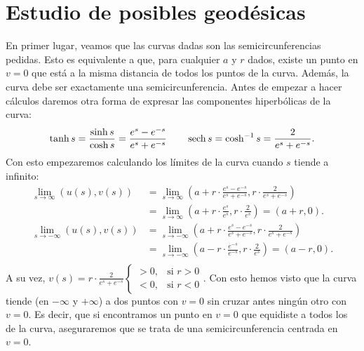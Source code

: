\section{Estudio de posibles geodésicas}
En primer lugar, veamos que las curvas dadas son las semicircunferencias
pedidas. Esto es equivalente a que, para cualquier $a$ y $r$ dados, existe un
punto en $v = 0$ que está a la misma distancia de todos los puntos de la curva.
Además, la curva debe ser exactamente una semicircunferencia. Antes de empezar
a hacer cálculos daremos otra forma de expresar las componentes hiperbólicas de
la curva:
\[
\tanh s = \frac{\sinh s}{\cosh s} = \frac{e^s - e^{-s}}{e^{s} + e^{-s}}\qquad
\operatorname{sech} s = \cosh^{-1} s = \frac{2}{e^s + e^{-s}}.
\]
Con esto empezaremos calculando los límites de la curva cuando $s$ tiende a
infinito:
\begin{align*}
    \lim_{s \rightarrow \infty} \left( u\left( s \right), v\left( s \right)
    \right) &= \lim_{s \rightarrow \infty} \left( a + r \cdot \frac{e^s -
    e^{-s}}{e^s + e^{-s}}, r \cdot \frac{2}{e^s + e^{-s}} \right)\\
    &= \lim_{s \rightarrow \infty} \left( a + r \cdot \frac{e^s}{e^s}, r
    \cdot \frac{2}{e^s} \right) = \left( a + r, 0 \right).\\
    \lim_{s \rightarrow -\infty} \left( u\left( s \right), v\left( s \right)
    \right) &= \lim_{s \rightarrow -\infty} \left( a + r \cdot \frac{e^s -
    e^{-s}}{e^s + e^{-s}}, r \cdot \frac{2}{e^s + e^{-s}} \right)\\
    &= \lim_{s \rightarrow -\infty} \left( a - r \cdot \frac{e^{-s}}{e^{-s}}, r
    \cdot \frac{2}{e^s} \right) = \left( a - r, 0 \right).\\
\end{align*}
A su vez, $v\left( s \right) = r \cdot \frac{2}{e^s + e^{-s}} \begin{cases} > 0,
&\text{si } r > 0\\ < 0, &\text{si } r < 0 \end{cases}$. Con esto hemos visto
que la curva tiende (en $-\infty$ y $+\infty$) a dos puntos con $v = 0$  sin
cruzar antes ningún otro con $v = 0$. Es decir, que si encontramos un punto en
$v = 0$ que equidiste a todos los de la curva, aseguraremos que se trata de una
semicircunferencia centrada en $v = 0$.

